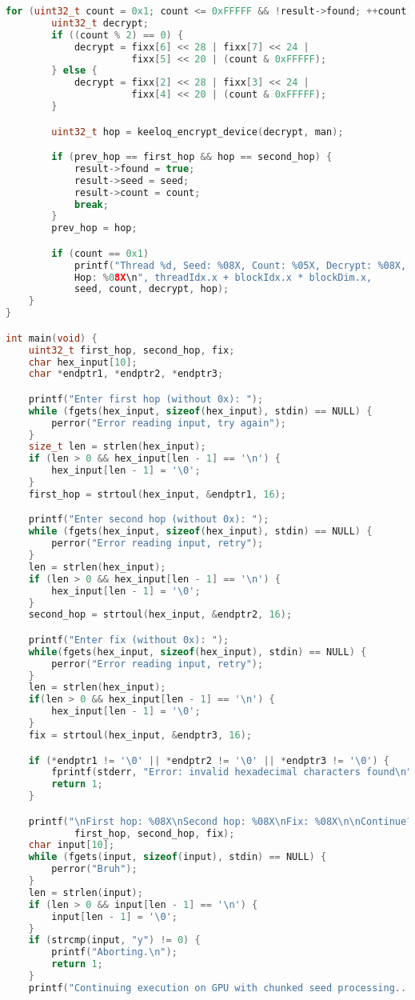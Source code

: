 \begin{lstlisting}[language=C++,showstringspaces=false]
    for (uint32_t count = 0x1; count <= 0xFFFFF && !result->found; ++count) {
        uint32_t decrypt;
        if ((count % 2) == 0) {
            decrypt = fixx[6] << 28 | fixx[7] << 24 |
                      fixx[5] << 20 | (count & 0xFFFFF);
        } else {
            decrypt = fixx[2] << 28 | fixx[3] << 24 |
                      fixx[4] << 20 | (count & 0xFFFFF);
        }

        uint32_t hop = keeloq_encrypt_device(decrypt, man);

        if (prev_hop == first_hop && hop == second_hop) {
            result->found = true;
            result->seed = seed;
            result->count = count;
            break;
        }
        prev_hop = hop;

        if (count == 0x1)
            printf("Thread %d, Seed: %08X, Count: %05X, Decrypt: %08X,
            Hop: %08X\n", threadIdx.x + blockIdx.x * blockDim.x,
            seed, count, decrypt, hop);
    }
}

int main(void) {
    uint32_t first_hop, second_hop, fix;
    char hex_input[10];
    char *endptr1, *endptr2, *endptr3;

    printf("Enter first hop (without 0x): ");
    while (fgets(hex_input, sizeof(hex_input), stdin) == NULL) {
        perror("Error reading input, try again");
    }
    size_t len = strlen(hex_input);
    if (len > 0 && hex_input[len - 1] == '\n') {
        hex_input[len - 1] = '\0';
    }
    first_hop = strtoul(hex_input, &endptr1, 16);

    printf("Enter second hop (without 0x): ");
    while (fgets(hex_input, sizeof(hex_input), stdin) == NULL) {
        perror("Error reading input, retry");
    }
    len = strlen(hex_input);
    if (len > 0 && hex_input[len - 1] == '\n') {
        hex_input[len - 1] = '\0';
    }
    second_hop = strtoul(hex_input, &endptr2, 16);

    printf("Enter fix (without 0x): ");
    while(fgets(hex_input, sizeof(hex_input), stdin) == NULL) {
        perror("Error reading input, retry");
    }
    len = strlen(hex_input);
    if(len > 0 && hex_input[len - 1] == '\n') {
        hex_input[len - 1] = '\0';
    }
    fix = strtoul(hex_input, &endptr3, 16);

    if (*endptr1 != '\0' || *endptr2 != '\0' || *endptr3 != '\0') {
        fprintf(stderr, "Error: invalid hexadecimal characters found\n");
        return 1;
    }

    printf("\nFirst hop: %08X\nSecond hop: %08X\nFix: %08X\n\nContinue? (y/N) ",
            first_hop, second_hop, fix);
    char input[10];
    while (fgets(input, sizeof(input), stdin) == NULL) {
        perror("Bruh");
    }
    len = strlen(input);
    if (len > 0 && input[len - 1] == '\n') {
        input[len - 1] = '\0';
    }
    if (strcmp(input, "y") != 0) {
        printf("Aborting.\n");
        return 1;
    }
    printf("Continuing execution on GPU with chunked seed processing...\n");


\end{lstlisting}
